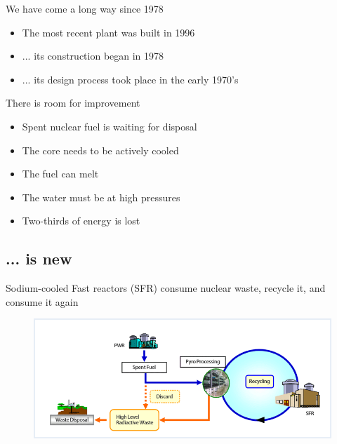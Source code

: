 \documentclass{beamer}
\begin{document}
        \begin{frame}{We have come a long way since 1978}
            \begin{itemize}
                \item The most recent plant was built in 1996
                \pause
                \item ... its construction began in 1978
                \pause
                \item ... its design process took place in the early 1970's
            \end{itemize}
        \end{frame}

        \begin{frame}{There is room for improvement}
            \begin{itemize}
                \item Spent nuclear fuel is waiting for disposal
                \pause
                \item The core needs to be actively cooled
                \pause
                \item The fuel can melt
                \pause
                \item The water must be at high pressures
                \pause
                \item Two-thirds of energy is lost
            \end{itemize}
        \end{frame}

    \subsection{... is new}

        \begin{frame}{Sodium-cooled Fast reactors (SFR) consume nuclear waste, recycle it, and consume it again}
            \begin{figure}
                \centering
                \includegraphics[width=1.0\textwidth]{./img/fastCycle.png}
                \caption*{}
            \end{figure}
        \end{frame}
\end{document}
